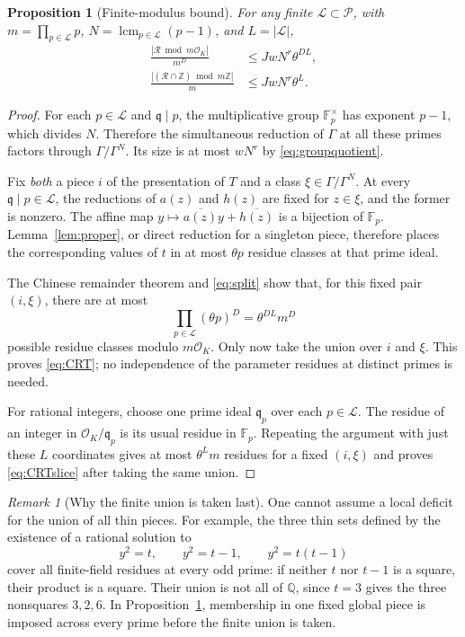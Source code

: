 \documentclass[11pt,a4paper]{article}
\newtheorem{proposition}[theorem]{Proposition}
\theoremstyle{definition}
\theoremstyle{remark}
\newtheorem{remark}[theorem]{Remark}
\newcommand{\Q}{\mathbb Q}
\newcommand{\Z}{\mathbb Z}
\newcommand{\F}{\mathbb F}
\newcommand{\OK}{\mathcal O_K}
\newcommand{\cP}{\mathcal P}
\newcommand{\cL}{\mathcal L}
\newcommand{\cR}{\mathcal R}
\DeclareMathOperator{\lcm}{lcm}
\begin{document}
\begin{proposition}[Finite-modulus bound]\label{prop:CRT}
For any finite $\cL\subset\cP$, with
$m=\prod_{p\in\cL}p$, $N=\lcm_{p\in\cL}(p-1)$, and $L=|\cL|$,
\begin{align}
 \frac{|\cR\bmod m\OK|}{m^D}
 &\le JwN^r\theta^{DL},\label{eq:CRT}\\
 \frac{|(\cR\cap\Z)\bmod m\Z|}{m}
 &\le JwN^r\theta^L.\label{eq:CRTslice}
\end{align}
\end{proposition}
\begin{proof}
For each $p\in\cL$ and $\mathfrak q\mid p$, the multiplicative group
$\F_p^\times$ has exponent $p-1$, which divides $N$. Therefore the
simultaneous reduction of $\Gamma$ at all these primes factors through
$\Gamma/\Gamma^N$. Its size is at most $wN^r$ by
\eqref{eq:groupquotient}.

Fix \emph{both} a piece $i$ of the presentation of $T$ and a class
$\xi\in\Gamma/\Gamma^N$. At every $\mathfrak q\mid p\in\cL$, the
reductions of $a(z)$ and $h(z)$ are fixed for $z\in\xi$, and the former
is nonzero. The affine map $y\mapsto\overline{a(z)}y+\overline{h(z)}$
is a bijection of $\F_p$. Lemma~\ref{lem:proper}, or direct reduction for
a singleton piece, therefore places the corresponding values of $t$ in
at most $\theta p$ residue classes at that prime ideal.

The Chinese remainder theorem and \eqref{eq:split} show that, for this
fixed pair $(i,\xi)$, there are at most
\[
 \prod_{p\in\cL}(\theta p)^D=\theta^{DL}m^D
\]
possible residue classes modulo $m\OK$. Only now take the union over
$i$ and $\xi$. This proves \eqref{eq:CRT}; no independence of the
parameter residues at distinct primes is needed.

For rational integers, choose one prime ideal $\mathfrak q_p$ over
each $p\in\cL$. The residue of an integer in $\OK/\mathfrak q_p$
is its usual residue in $\F_p$. Repeating the argument with just these
$L$ coordinates gives at most $\theta^Lm$ residues for a fixed
$(i,\xi)$ and proves \eqref{eq:CRTslice} after taking the same union.
\end{proof}

\begin{remark}[Why the finite union is taken last]\label{rem:union}
One cannot assume a local deficit for the union of all thin pieces.
For example, the three thin sets defined by the existence of a rational
solution to
\[
 y^2=t,\qquad y^2=t-1,\qquad y^2=t(t-1)
\]
cover all finite-field residues at every odd prime: if neither $t$ nor
$t-1$ is a square, their product is a square. Their union is not all of
$\Q$, since $t=3$ gives the three nonsquares $3,2,6$. In
Proposition~\ref{prop:CRT}, membership in one fixed global piece is
imposed across every prime before the finite union is taken.
\end{remark}
\end{document}
